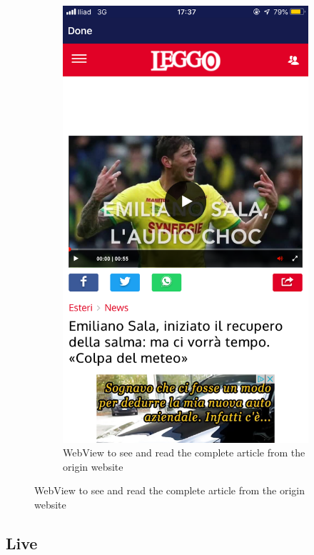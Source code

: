 \documentclass[numbers=noenddot, 12pt, a4paper, oneside]{scrbook}
\begin{document}
\begin{figure}[H]
\begin{subfigure}{.5\textwidth}
		\includegraphics[width=.8\linewidth]{images/Screen/WebView}
		\caption{WebView to see and read the complete article from the origin website}
	\end{subfigure}
\end{figure}

\subsection*{Live}
\end{document}
